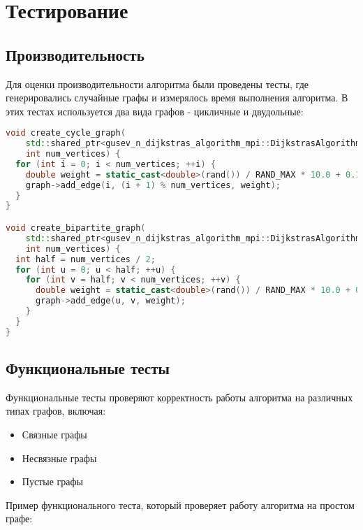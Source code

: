 \documentclass[12pt]{article}
\begin{document}
\section{Тестирование}
\subsection{Производительность}
Для оценки производительности алгоритма были проведены тесты, где генерировались случайные графы и измерялось время выполнения алгоритма.
В этих тестах используется два вида графов - цикличные и двудольные:
\begin{lstlisting}[language=c++, caption={Пример функционального теста}]
void create_cycle_graph(
    std::shared_ptr<gusev_n_dijkstras_algorithm_mpi::DijkstrasAlgorithmParallel::SparseGraphCRS>& graph,
    int num_vertices) {
  for (int i = 0; i < num_vertices; ++i) {
    double weight = static_cast<double>(rand()) / RAND_MAX * 10.0 + 0.1;  // Random weight between 0.1 and 10.0
    graph->add_edge(i, (i + 1) % num_vertices, weight);                   // Connect in a cycle
  }
}

void create_bipartite_graph(
    std::shared_ptr<gusev_n_dijkstras_algorithm_mpi::DijkstrasAlgorithmParallel::SparseGraphCRS>& graph,
    int num_vertices) {
  int half = num_vertices / 2;
  for (int u = 0; u < half; ++u) {
    for (int v = half; v < num_vertices; ++v) {
      double weight = static_cast<double>(rand()) / RAND_MAX * 10.0 + 0.1;  // Random weight between 0.1 and 10.0
      graph->add_edge(u, v, weight);
    }
  }
}
\end{lstlisting}
\subsection{Функциональные тесты}
Функциональные тесты проверяют корректность работы алгоритма на различных типах графов, включая:
\begin{itemize}
    \item Связные графы
    \item Несвязные графы
    \item Пустые графы
\end{itemize}
Пример функционального теста, который проверяет работу алгоритма на простом графе:
\end{document}
